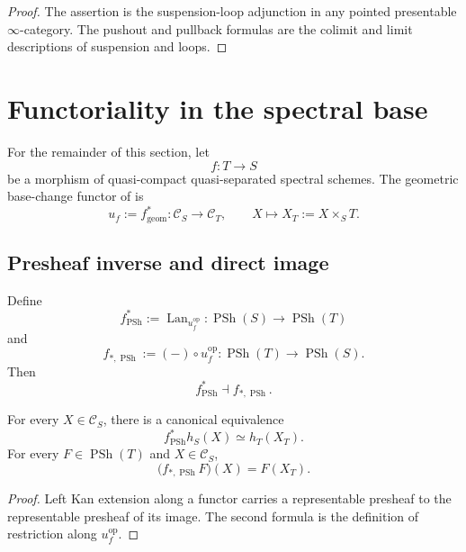 \begin{proof}
The assertion is the suspension-loop adjunction in any pointed
presentable \(\infty\)-category.  The pushout and pullback formulas are
the colimit and limit descriptions of suspension and loops.
\end{proof}

\section{Functoriality in the spectral base}
\label{sec:brave-new-motivic-base-functoriality}

For the remainder of this section, let
\[
    f
    \colon
    T
    \longrightarrow
    S
\]
be a morphism of quasi-compact quasi-separated spectral schemes.  The
geometric base-change functor of
is
\[
    u_f
    :=
    f^*_{\mathrm{geom}}
    \colon
    \mathcal C_S
    \longrightarrow
    \mathcal C_T,
    \qquad
    X
    \longmapsto
    X_T:=X\times_ST.
\]

\subsection{Presheaf inverse and direct image}

\begin{construction}
\label{con:presheaf-base-change-adjunction}
Define
\[
    f^*_{\operatorname{PSh}}
    :=
    \operatorname{Lan}_{u_f^{\mathrm{op}}}
    \colon
    \operatorname{PSh}(S)
    \longrightarrow
    \operatorname{PSh}(T)
\]
and
\[
    f_{*,\operatorname{PSh}}
    :=
    (-)\circ u_f^{\mathrm{op}}
    \colon
    \operatorname{PSh}(T)
    \longrightarrow
    \operatorname{PSh}(S).
\]
Then
\[
    f^*_{\operatorname{PSh}}
    \dashv
    f_{*,\operatorname{PSh}}.
\]
\end{construction}

\begin{proposition}
\label{prop:presheaf-base-change-formulas}
For every \(X\in\mathcal C_S\), there is a canonical equivalence
\[
    f^*_{\operatorname{PSh}}h_S(X)
    \simeq
    h_T(X_T).
\]
For every \(F\in\operatorname{PSh}(T)\) and
\(X\in\mathcal C_S\),
\[
    \bigl(
        f_{*,\operatorname{PSh}}F
    \bigr)(X)
    =
    F(X_T).
\]
\end{proposition}

\begin{proof}
Left Kan extension along a functor carries a representable presheaf to
the representable presheaf of its image.  The second formula is the
definition of restriction along \(u_f^{\mathrm{op}}\).
\end{proof}

